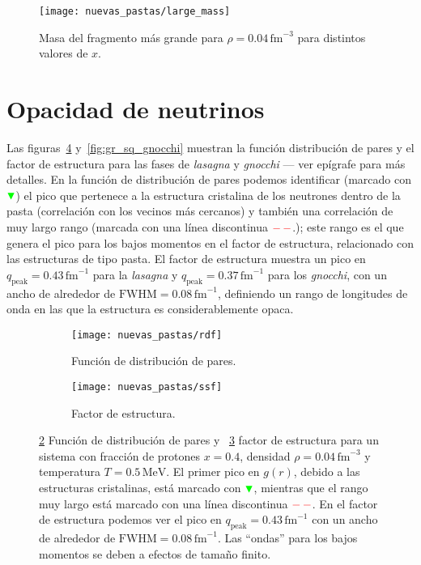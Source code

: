 \begin{figure}
  \centering
  \texttt{[image: nuevas\_pastas/large\_mass]}
  \caption{Masa del fragmento más grande para $\rho = 0.04\,\text{fm}^{-3}$ para distintos valores de $x$.}
  \label{fig:large_mass}
\end{figure}

\section{Opacidad de neutrinos}\label{sc:opacity}

Las figuras~\ref{fig:gr_sq} y~\ref{fig:gr_sq_gnocchi} muestran la función distribución de pares y el factor de estructura  para las fases de \emph{lasagna} y \emph{gnocchi} --- ver epígrafe para más detalles.
En la función de distribución de pares podemos identificar (marcado con $\color{green} \blacktriangledown$) el pico que pertenece a la estructura cristalina de los neutrones dentro de la pasta (correlación con los vecinos más cercanos) y también una correlación de muy largo rango (marcada con una línea discontinua $\color{red}-\,-$.);
este rango es el que genera el pico para los bajos momentos en el factor de estructura, relacionado con las estructuras de tipo pasta.
El factor de estructura muestra un pico en $q_\text{peak} = 0.43\,\text{fm}^{-1}$ para la \emph{lasagna} y $q_\text{peak} = 0.37\,\text{fm}^{-1}$ para los \emph{gnocchi}, con un ancho de alrededor de
$\text{FWHM} = 0.08\,\text{fm}^{-1}$, definiendo un rango de longitudes de onda en las que la estructura es considerablemente opaca.

\begin{figure}  \centering
  \begin{subfigure}[h!]{0.4\columnwidth}
    \centering
    \texttt{[image: nuevas\_pastas/rdf]}
    \caption{Función de distribución de pares.}
      \label{sfig:gr}
  \end{subfigure}
  \begin{subfigure}[h!]{0.4\columnwidth}
    \centering
    \texttt{[image: nuevas\_pastas/ssf]}
    \caption{Factor de estructura.}
      \label{sfig:ssf}
  \end{subfigure}
  \caption{\ref{sfig:gr} Función de distribución de pares y ~\ref{sfig:ssf} factor de estructura para un sistema con fracción de protones $x=0.4$, densidad $\rho=0.04\,\text{fm}^{-3}$ y temperatura $T=0.5\,\text{MeV}$.
    El primer pico en $g(r)$, debido a las estructuras cristalinas, está marcado con $\color{green} \blacktriangledown$, mientras que el rango muy largo está marcado con una línea discontinua $\color{red}-\,-$.
    En el factor de estructura podemos ver el pico en $q_\text{peak} = 0.43\,\text{fm}^{-1}$ con un ancho de alrededor de $\text{FWHM} = 0.08\,\text{fm}^{-1}$.
    Las ``ondas'' para los bajos momentos se deben a efectos de tamaño finito.}
  \label{fig:gr_sq}
\end{figure}

